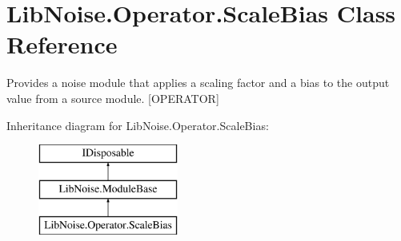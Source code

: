 \hypertarget{class_lib_noise_1_1_operator_1_1_scale_bias}{}\section{Lib\+Noise.\+Operator.\+Scale\+Bias Class Reference}
\label{class_lib_noise_1_1_operator_1_1_scale_bias}


Provides a noise module that applies a scaling factor and a bias to the output value from a source module. \mbox{[}O\+P\+E\+R\+A\+T\+OR\mbox{]}  


Inheritance diagram for Lib\+Noise.\+Operator.\+Scale\+Bias\+:\begin{figure}[H]
\begin{center}
\leavevmode
\includegraphics[height=3.000000cm]{class_lib_noise_1_1_operator_1_1_scale_bias}
\end{center}
\end{figure}
